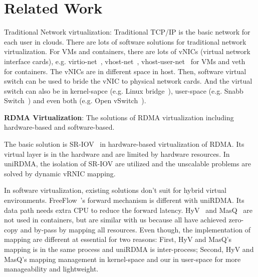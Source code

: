 \section{Related Work}


Traditional Network virtualization: Traditional TCP/IP is the basic network for each user in clouds. There are lots of software solutions for traditional network virtualization. For VMs and containers, there are lots of vNICs (virtual network interface cards), e.g. virtio-net~\cite{virtio-russell2008}, vhost-net~\cite{vhost-net},  vhost-user-net~\cite{vhost-user-net} for VMs and veth~\cite{veth} for containers. The vNICs are in different space in host. Then, software virtual switch can be used to bride the vNIC to physical network cards. And the virtual switch can also be in kernel-sapce (e.g. Linux bridge~\cite{linux-bridge}), user-space (e.g. Snabb Switch~\cite{snabb}) and even both (e.g. Open vSwitch~\cite{ovs-2015}).  

\textbf{RDMA Virtualization}: The solutions of RDMA virtualization including hardware-based and software-based.

The basic solution is SR-IOV~\cite{sr-iov} in hardware-based virtualization of RDMA. Its virtual layer is in the hardware and are limited by hardware resources. In uniRDMA, the isolation of SR-IOV are utilized and the unscalable problems are solved by dynamic vRNIC mapping. 

In software virtualization, existing solutions don’t suit for hybrid virtual environments. FreeFlow~\cite{kim2019freeflow}'s forward mechanism is different with uniRDMA. Its data path needs extra CPU to reduce the forward latency. HyV~\cite{pfefferle2015hybrid} and MasQ~\cite{he2020masq} are not used in containers, but are similar with us because all have achieved zero-copy and by-pass by mapping all resources. Even though, the implementation of mapping are different at essential for two reasons: First, HyV and MasQ's mapping is in the same process and uniRDMA is inter-process; Second, HyV and MasQ's mapping management in kernel-space and our in user-space for more manageability and lightweight.
